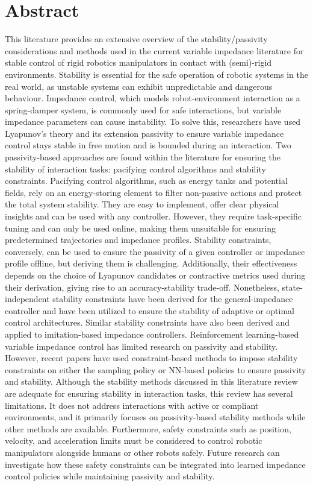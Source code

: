 \chapter*{Abstract}

This literature provides an extensive overview of the stability/passivity considerations and methods used in the current variable impedance literature for stable control of rigid robotics manipulators in contact with (semi)-rigid environments. Stability is essential for the safe operation of robotic systems in the real world, as unstable systems can exhibit unpredictable and dangerous behaviour. Impedance control, which models robot-environment interaction as a spring-damper system, is commonly used for safe interactions, but variable impedance parameters can cause instability. To solve this, researchers have used Lyapunov's theory and its extension passivity to ensure variable impedance control stays stable in free motion and is bounded during an interaction. Two passivity-based approaches are found within the literature for ensuring the stability of interaction tasks: pacifying control algorithms and stability constraints. Pacifying control algorithms, such as energy tanks and potential fields, rely on an energy-storing element to filter non-passive actions and protect the total system stability. They are easy to implement, offer clear physical insights and can be used with any controller. However, they require task-specific tuning and can only be used online, making them unsuitable for ensuring predetermined trajectories and impedance profiles. Stability constraints, conversely, can be used to ensure the passivity of a given controller or impedance profile offline, but deriving them is challenging. Additionally, their effectiveness depends on the choice of Lyapunov candidates or contractive metrics used during their derivation, giving rise to an accuracy-stability trade-off. Nonetheless, state-independent stability constraints have been derived for the general-impedance controller and have been utilized to ensure the stability of adaptive or optimal control architectures. Similar stability constraints have also been derived and applied to imitation-based impedance controllers. Reinforcement learning-based variable impedance control has limited research on passivity and stability. However, recent papers have used constraint-based methods to impose stability constraints on either the sampling policy or NN-based policies to ensure passivity and stability. Although the stability methods discussed in this literature review are adequate for ensuring stability in interaction tasks, this review has several limitations. It does not address interactions with active or compliant environments, and it primarily focuses on passivity-based stability methods while other methods are available. Furthermore, safety constraints such as position, velocity, and acceleration limits must be considered to control robotic manipulators alongside humans or other robots safely. Future research can investigate how these safety constraints can be integrated into learned impedance control policies while maintaining passivity and stability.
